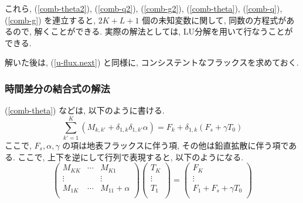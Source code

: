 これら,
(\ref{comb-theta2}), (\ref{comb-q2}), (\ref{comb-g2}), 
(\ref{comb-theta}), (\ref{comb-q}), (\ref{comb-g})
を連立すると, $2K+L+1$ 個の未知変数に関して, 
同数の方程式があるので, 解くことができる.
実際の解法としては, LU分解を用いて行なうことができる.

解いた後は, 
(\ref{u-flux.next}) と同様に,
コンシステントなフラックスを求めておく.

\subsubsection{時間差分の結合式の解法}

(\ref{comb-theta}) などは, 以下のように書ける.
%
\begin{equation}
  \sum_{k'=1}^{K} ( M_{k,k'} + \delta_{1,k} \delta_{1,k'} \alpha)
    = F_k + \delta_{1,k} ( F_s + \gamma T_0 )
\end{equation}
ここで, $F_s, \alpha, \gamma$
の項は地表フラックスに伴う項,
その他は鉛直拡散に伴う項である.
%
ここで, 上下を逆にして行列で表現すると, 以下のようになる.
%
\begin{equation}
  \left( \begin{array}{lll} M_{KK} & \cdots & M_{K1} \\ \vdots & &
  \vdots \\ M_{1K} & \cdots & M_{11} + \alpha \\
\end{array}  \right)
\left( \begin{array}{l} T_K \\ \vdots \\ T_1 \\
\end{array}  \right)
= \left( \begin{array}{l} F_K \\ \vdots \\ F_1 + F_s + \gamma T_{0} \\
\end{array} \right)
\end{equation}

